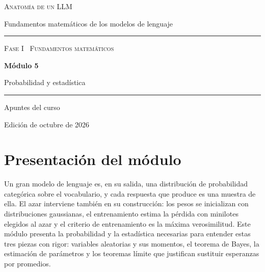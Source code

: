 \documentclass[11pt,a4paper,twoside,openany]{book}
\begin{document}
\frontmatter
\begin{titlepage}
\centering
\vspace*{2.5cm}
{\large\scshape Anatomía de un LLM}\par
\vspace{0.4cm}
{\normalsize Fundamentos matemáticos de los modelos de lenguaje}\par
\vspace{2.2cm}
\rule{\textwidth}{0.8pt}\par\vspace{0.5cm}
{\small\scshape Fase I \textperiodcentered\ Fundamentos matemáticos}\par\vspace{0.3cm}
{\Huge\bfseries Módulo 5\par}\vspace{0.3cm}
{\LARGE Probabilidad y estadística\par}
\vspace{0.5cm}\rule{\textwidth}{0.4pt}\par
\vspace{1.6cm}
{\large Apuntes del curso}\par
\vfill
{\small Edición de octubre de 2026}\par
\end{titlepage}

\chapter*{Presentación del módulo}

Un gran modelo de lenguaje es, en su salida, una distribución de probabilidad categórica sobre el vocabulario, y cada respuesta que produce es una muestra de ella. El azar interviene también en su construcción: los pesos se inicializan con distribuciones gaussianas, el entrenamiento estima la pérdida con minilotes elegidos al azar y el criterio de entrenamiento es la máxima verosimilitud. Este módulo presenta la probabilidad y la estadística necesarias para entender estas tres piezas con rigor: variables aleatorias y sus momentos, el teorema de Bayes, la estimación de parámetros y los teoremas límite que justifican sustituir esperanzas por promedios.
\end{document}
